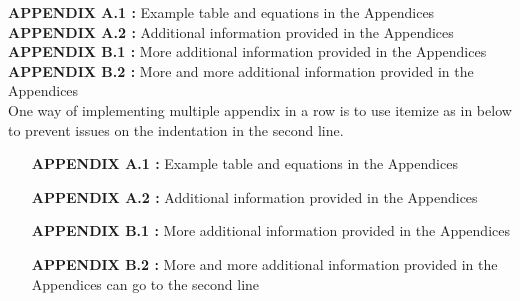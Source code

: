 \singlespacing
\textbf{APPENDIX A.1 :} Example table and equations in the Appendices\\
\textbf{APPENDIX A.2 :} Additional information provided in the Appendices\\
\textbf{APPENDIX B.1 :} More additional information provided in the Appendices\\
\textbf{APPENDIX B.2 :} More and more additional information provided in the Appendices\\

One way of implementing multiple appendix in a row is to use itemize as in below to prevent issues on the indentation in the second line.

\begin{itemize}[leftmargin=3.3cm,itemsep=-0.4em,labelsep=1.5mm] %
\item [\textbf{APPENDIX A.1 :}]Example table and equations in the Appendices
\item [\textbf{APPENDIX A.2 :}]Additional information provided in the Appendices
\item [\textbf{APPENDIX B.1 :}]More additional information provided in the Appendices
\item [\textbf{APPENDIX B.2 :}]More and more additional information provided in the Appendices can go to the second line
\end{itemize}



\newpage